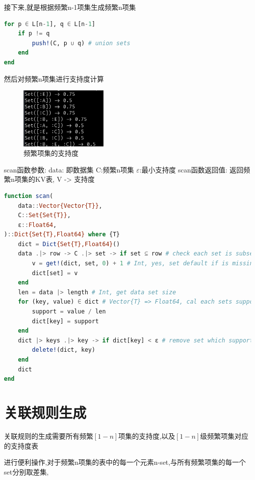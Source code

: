 \documentclass[a4paper]{article}
\begin{document}
接下来,就是根据频繁n-1项集生成频繁n项集

\begin{lstlisting}[language=julia]
for p ∈ L[n-1], q ∈ L[n-1]
    if p != q
        push!(C, p ∪ q) # union sets
    end
end
\end{lstlisting}

然后对频繁n项集进行支持度计算

\begin{figure}[h]
    \centering
    \label{figure:result-itemset}
    \includegraphics[height=3cm]{result-itemset.png}
    \caption{频繁项集的支持度}
\end{figure}

scan函数参数:
data: 即数据集
C:频繁n项集
$\varepsilon$:最小支持度
scan函数返回值:
返回频繁n项集的KV表, V -> 支持度

\begin{lstlisting}[language=julia]
function scan(
    data::Vector{Vector{T}},
    C::Set{Set{T}},
    ε::Float64,
)::Dict{Set{T},Float64} where {T}
    dict = Dict{Set{T},Float64}()
    data .|> row -> C .|> set -> if set ⊆ row # check each set is subset of each row in data which in C
        v = get!(dict, set, 0) + 1 # Int, yes, set default if is missing, and get value
        dict[set] = v
    end
    len = data |> length # Int, get data set size
    for (key, value) ∈ dict # Vector{T} => Float64, cal each sets support%
        support = value / len
        dict[key] = support
    end
    dict |> keys .|> key -> if dict[key] < ε # remove set which support less than ε
        delete!(dict, key)
    end
    dict
end
\end{lstlisting}

\newpage

\section{关联规则生成} \label {rule generate}

关联规则的生成需要所有频繁$[1-n]$项集的支持度,以及$[1-n]$级频繁项集对应的支持度表

进行便利操作,对于频繁n项集的表中的每一个元素n-set,与所有频繁项集的每一个set分别取差集,
\end{document}
